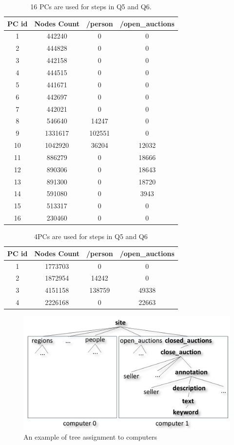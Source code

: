 \begin{table}[t]
	\caption{16 PCs are used for steps in Q5 and Q6.}
	\label{table:discussionexp16}
	\centering
	\begin{tabular}{c|c|c|c}
		\hline
		\hline
	 PC id	& Nodes Count	& /person & /open\_auctions \\ 		
		\hline 
		1 &	442240	& 0	& 0  \\ 
		\hline 	
		2 &	444828		& 0	& 0  \\ 
		\hline 	
		3 &	442158		& 0	& 0  \\ 
		\hline 		
		4 &	444515		& 0	& 0  \\ 
		\hline 		
		5 &	441671		& 0	& 0  \\ 
		\hline 		
		6 &	442697		& 0	& 0  \\ 
		\hline 		
		7 &	442021		& 0	& 0  \\ 
		\hline 	
		8 &	546640 &	14247 & 0	\\
		\hline
		9 &	1331617 &	102551 & 0	\\
		\hline
		10 & 1042920	& 36204	& 12032 \\
		\hline
		11 &	886279	&0	& 18666 \\
		\hline
		12 &	890306  & 0 &	18643 \\
		\hline
		13 & 891300		& 0 & 18720 \\
		\hline
		14 &	591080	& 0	& 3943 \\
		\hline
		15 &	513317	& 0 & 0	\\
		\hline
		16 &	230460	& 0 & 0	 \\
		\hline 
	\end{tabular}
\end{table}

\begin{table}[t]
	\caption{4PCs are used for steps in Q5 and Q6}
	\label{table:discussionexp4}
	\centering
	\begin{tabular}{c|c|c|c}
		\hline
		\hline
		PC id	& Nodes Count	& /person & /open\_auctions \\ 		
		\hline 
		1 &	1773703	& 0	& 0  \\ 
		\hline 	
		2 &	1872954		& 14242	& 0  \\ 
		\hline 	
		3 &	4151158		& 138759	& 49338  \\ 
		\hline 		
		4 &	2226168		& 0	& 22663  \\ 
		\hline
	\end{tabular}
\end{table}


\begin{figure}[t]
	\includegraphics[width=.99\linewidth]{partialtree/figures/xmlgen2.png}
	\caption{An example of tree assignment to computers}
	\label{fig:xmlgen2}
\end{figure}

